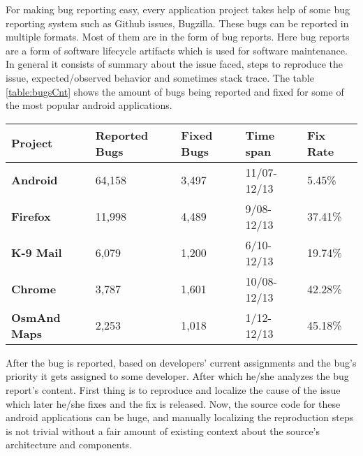 \documentclass[sigconf]{acmart}
\begin{document}
For making bug reporting easy, every application project takes help of some bug reporting system such as Github issues, Bugzilla. These bugs can be reported in multiple formats. Most of them are in the form of bug reports. Here bug reports are a form of software lifecycle artifacts which is used for software maintenance. In general it consists of summary about the issue faced, steps to reproduce the issue, expected/observed behavior and sometimes stack trace. The table \ref{table:bugsCnt} shows the amount of bugs being reported and fixed for some of the most popular android applications\cite{zhou_neamtiu_gupta_2015}.

\begin{table*}[]
	\begin{tabular}{|l|l|l|l|l|}
		\hline
		\textbf{Project}              & \textbf{Reported Bugs} & \textbf{Fixed Bugs} & \textbf{Time span} & \textbf{Fix Rate} \\ \hline
		\textbf{Android}     & 64,158                 & 3,497               & 11/07-12/13        & 5.45\%            \\ \hline
		\textbf{Firefox}     & 11,998                 & 4,489               & 9/08-12/13         & 37.41\%           \\ \hline
		\textbf{K-9 Mail}    & 6,079                  & 1,200               & 6/10-12/13         & 19.74\%           \\ \hline
		\textbf{Chrome}      & 3,787                  & 1,601               & 10/08-12/13        & 42.28\%           \\ \hline
		\textbf{OsmAnd Maps} & 2,253                  & 1,018               & 1/12-12/13         & 45.18\%           \\ \hline
	\end{tabular}
	\caption{Projects examined, bugs reported/fixed, time span}
	\label{table:bugsCnt}
\end{table*}


After the bug is reported, based on developers' current assignments and the bug's priority it gets assigned to some developer. After which he/she analyzes the bug report's content. First thing is to reproduce and localize the cause of the issue which later he/she fixes and the fix is released. Now, the source code for these android applications can be huge, and manually localizing the reproduction steps is not trivial without a fair amount of existing context about the source's architecture and components. 
\end{document}
